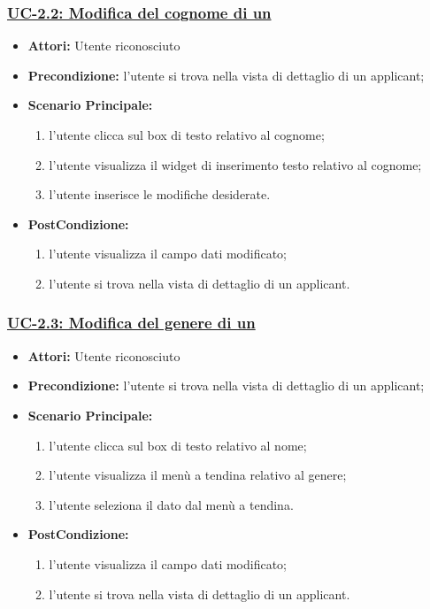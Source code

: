 \subsubsection{\underline{UC-2.2: Modifica del cognome di un \applicant}}
\begin{itemize}
	\item \textbf{Attori:} Utente riconosciuto
	\item \textbf{Precondizione:}  l'utente si trova nella vista di dettaglio di un applicant;
	\item \textbf{Scenario Principale:}
	\begin{enumerate}
		\item l'utente clicca sul box di testo relativo al cognome;
		\item l'utente visualizza il  widget di inserimento testo relativo al cognome;
		\item l'utente inserisce le modifiche desiderate.
	\end{enumerate}
	\item \textbf{PostCondizione:} 
	\begin{enumerate}
		\item l'utente visualizza il campo dati modificato;
		\item l'utente si trova nella vista di dettaglio di un applicant.
	\end{enumerate}
	
\end{itemize}

\subsubsection{\underline{UC-2.3: Modifica del genere di un \applicant}}
\begin{itemize}
	\item \textbf{Attori:} Utente riconosciuto
	\item \textbf{Precondizione:}  l'utente si trova nella vista di dettaglio di un applicant;
	\item \textbf{Scenario Principale:}
	\begin{enumerate}
		\item l'utente clicca sul box di testo relativo al nome;
		\item l'utente visualizza il  menù a tendina relativo al genere;
		\item l'utente seleziona il dato dal menù a tendina.
	\end{enumerate}
	\item \textbf{PostCondizione:} 
	\begin{enumerate}
		\item l'utente visualizza il campo dati modificato;
		\item l'utente si trova nella vista di dettaglio di un applicant.
	\end{enumerate}
	
\end{itemize}

